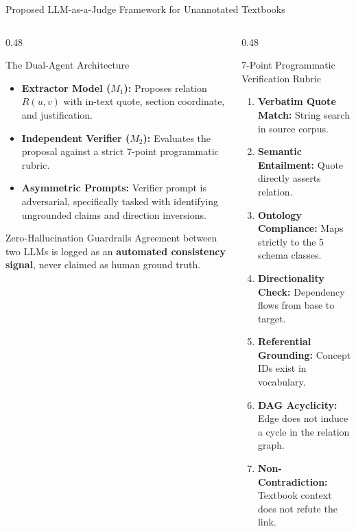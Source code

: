 \documentclass[aspectratio=169,10pt]{beamer}
\begin{document}
\begin{frame}{Proposed LLM-as-a-Judge Framework for Unannotated Textbooks}
    \begin{columns}[T]
        \begin{column}{0.48\textwidth}
            \begin{block}{The Dual-Agent Architecture}
                \begin{itemize}
                    \item \textbf{Extractor Model ($M_1$):} Proposes relation $R(u, v)$ with in-text quote, section coordinate, and justification.
                    \item \textbf{Independent Verifier ($M_2$):} Evaluates the proposal against a strict 7-point programmatic rubric.
                    \item \textbf{Asymmetric Prompts:} Verifier prompt is adversarial, specifically tasked with identifying ungrounded claims and direction inversions.
                \end{itemize}
            \end{block}

            \begin{alertblock}{Zero-Hallucination Guardrails}
                \footnotesize Agreement between two LLMs is logged as an \textbf{automated consistency signal}, never claimed as human ground truth.
            \end{alertblock}
        \end{column}

        \begin{column}{0.48\textwidth}
            \begin{exampleblock}{7-Point Programmatic Verification Rubric}
                \scriptsize
                \begin{enumerate}
                    \item \textbf{Verbatim Quote Match:} String search in source corpus.
                    \item \textbf{Semantic Entailment:} Quote directly asserts relation.
                    \item \textbf{Ontology Compliance:} Maps strictly to the 5 schema classes.
                    \item \textbf{Directionality Check:} Dependency flows from base to target.
                    \item \textbf{Referential Grounding:} Concept IDs exist in vocabulary.
                    \item \textbf{DAG Acyclicity:} Edge does not induce a cycle in the relation graph.
                    \item \textbf{Non-Contradiction:} Textbook context does not refute the link.
                \end{enumerate}
            \end{exampleblock}
        \end{column}
    \end{columns}
\end{frame}
\end{document}
